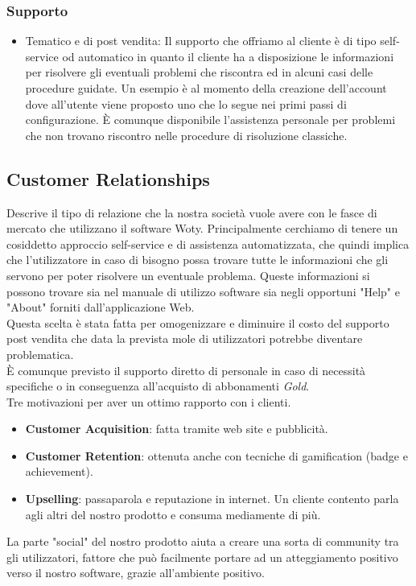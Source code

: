 \subsubsection{Supporto}
\begin{itemize}
\item Tematico e di post vendita: Il supporto che offriamo al cliente è di tipo self-service od automatico in quanto il cliente ha a disposizione le informazioni per risolvere gli eventuali problemi che riscontra ed in alcuni casi delle procedure guidate. Un esempio è al momento della creazione dell'account dove all'utente viene proposto uno  che lo segue nei primi passi di configurazione. È	 comunque disponibile l'assistenza personale per problemi che non trovano riscontro nelle procedure di risoluzione classiche.
\end{itemize}

\subsection{Customer Relationships}
Descrive il tipo di relazione che la nostra società vuole avere con le fasce di mercato che utilizzano il software Woty. Principalmente cerchiamo di tenere un cosiddetto approccio self-service e di assistenza automatizzata, che quindi implica che l'utilizzatore in caso di bisogno possa trovare tutte le informazioni che gli servono per poter risolvere un eventuale problema. Queste informazioni si possono trovare sia nel manuale di utilizzo software sia negli opportuni "Help" e "About" forniti dall'applicazione Web.\\
Questa scelta è stata fatta per omogenizzare e diminuire il costo del supporto post vendita che data la prevista mole di utilizzatori potrebbe diventare problematica.\\
È comunque previsto il supporto diretto di personale in caso di necessità specifiche o in conseguenza all'acquisto di abbonamenti \textit{Gold}. \\ Tre motivazioni per aver un ottimo rapporto con i clienti.
\begin{itemize}
\item \textbf{Customer Acquisition}: fatta tramite web site e pubblicità.
\item \textbf{Customer Retention}: ottenuta anche con tecniche di gamification (badge e achievement).
\item \textbf{Upselling}: passaparola e reputazione in internet. Un cliente contento parla agli altri del nostro prodotto e consuma mediamente di più.
\end{itemize}
La parte "social" del nostro prodotto aiuta a creare una sorta di community tra gli utilizzatori, fattore che può facilmente portare ad un atteggiamento positivo verso il nostro software, grazie all'ambiente positivo.

